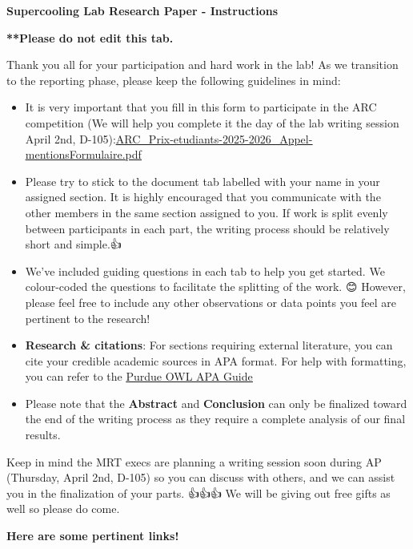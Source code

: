 \textbf{Supercooling Lab Research Paper - Instructions}

\textbf{**Please do not edit this tab.}

Thank you all for your participation and hard work in the lab! As we
transition to the reporting phase, please keep the following guidelines
in mind:

\begin{itemize}
\item
  It is very important that you fill in this form to participate in the
  ARC competition (We will help you complete it the day of the lab
  writing session April 2nd,
  D-105):\href{https://drive.google.com/file/d/1Ut9bQdEaYGbbIEvJomWCDojfBC1YSzDY/view?usp=sharing}{\ul{ARC\_Prix-etudiants-2025-2026\_Appel-mentionsFormulaire.pdf}}
\item
  Please try to stick to the document tab labelled with your name in
  your assigned section. It is highly encouraged that you communicate
  with the other members in the same section assigned to you. If work is
  split evenly between participants in each part, the writing process
  should be relatively short and simple.👍
\item
  We've included guiding questions in each tab to help you get started.
  We colour-coded the questions to facilitate the splitting of the work.
  😊 However, please feel free to include any other observations or data
  points you feel are pertinent to the research!
\item
  \textbf{Research \& citations}: For sections requiring external
  literature, you can cite your credible academic sources in APA format.
  For help with formatting, you can refer to the
  \href{https://owl.purdue.edu/owl/research_and_citation/apa_style/apa_formatting_and_style_guide/general_format.html}{\ul{Purdue
  OWL APA Guide}}
\item
  Please note that the \textbf{Abstract} and \textbf{Conclusion} can
  only be finalized toward the end of the writing process as they
  require a complete analysis of our final results.
\end{itemize}

Keep in mind the MRT execs are planning a writing session soon during AP
(Thursday, April 2nd, D-105) so you can discuss with others, and we can
assist you in the finalization of your parts. 👍👍👍 We will be giving
out free gifts as well so please do come.

\textbf{Here are some pertinent links!}

